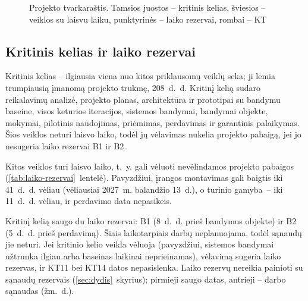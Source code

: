 \begin{landscape}
  \begin{figure}[htbp]
    \centering
    
    \caption{Projekto tvarkaraštis. Tamsios juostos – kritinis kelias, šviesios – veiklos su laisvu laiku, punktyrinės – laiko rezervai, rombai – KT}
    \label{fig:gantt}
  \end{figure}
\end{landscape}

\subsection{Kritinis kelias ir laiko rezervai}

Kritinis kelias – ilgiausia viena nuo kitos priklausomų veiklų seka; ji
lemia trumpiausią įmanomą projekto trukmę, 208~d.~d. Kritinį kelią sudaro
reikalavimų analizė, projekto planas, architektūra ir prototipai su bandymu
baseine, visos keturios iteracijos, sistemos bandymai, bandymai objekte,
mokymai, pilotinis naudojimas, priėmimas, perdavimas ir garantinis
palaikymas. Šios veiklos neturi laisvo laiko, todėl jų vėlavimas nukelia
projekto pabaigą, jei jo nesugeria laiko rezervai B1 ir B2.

Kitos veiklos turi laisvo laiko, t.~y. gali vėluoti nevėlindamos projekto
pabaigos (\ref{tab:laiko-rezervai}~lentelė). Pavyzdžiui, įrangos montavimas
gali baigtis iki 41~d.~d. vėliau (vėliausiai 2027~m. balandžio 13~d.), o
turinio gamyba~– iki 11~d.~d. vėliau, ir perdavimo data nepasikeis.

Kritinį kelią saugo du laiko rezervai: B1 (8~d.~d. prieš bandymus objekte)
ir B2 (5~d.~d. prieš perdavimą). Šiais laikotarpiais darbų neplanuojama, todėl sąnaudų jie
neturi. Jei kritinio kelio veikla vėluoja (pavyzdžiui, sistemos bandymai
užtrunka ilgiau arba baseinas laikinai neprieinamas), vėlavimą sugeria laiko
rezervas, ir KT11 bei KT14 datos nepasislenka. Laiko rezervų nereikia
painioti su sąnaudų rezervais (\ref{sec:dydis}~skyrius): pirmieji saugo
datas, antrieji – darbo sąnaudas (žm.~d.).

